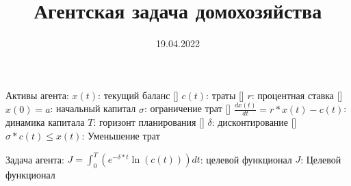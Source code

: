 \documentclass{a_model}
\title{Агентская задача домохозяйства}
\date{19.04.2022}
\begin{document}
Активы агента:
    $x(t)$: текущий баланс []
    $c(t)$: траты []
    $r$: процентная ставка []
    $x(0)=a$: начальный капитал
    $\sigma$: ограничение трат []
    $\frac{dx(t)}{dt} = r*x(t)-c(t)$: динамика капитала
    $T$: горизонт планирования []
    $\delta$: дисконтирование []
    $\sigma*c(t)\leq x(t)$: Уменьшение трат

Задача агента:
    $J = \int_0^T (e^{-\delta*t} \ln(c(t)))dt$: целевой функционал
    $J$: Целевой функционал
\end{document}
